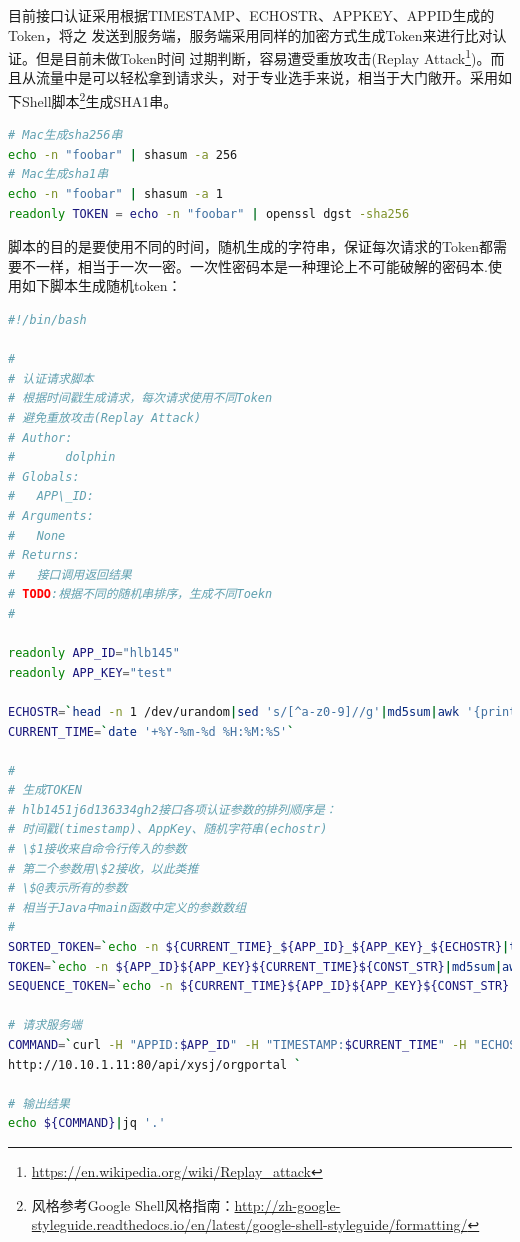 \documentclass[12pt]{book}
\numberwithin{dummy}{section}
\theoremstyle{ocrenumbox}
\theoremstyle{blacknumex}
\theoremstyle{blacknumbox}
\theoremstyle{ocrenum}
\begin{document}
目前接口认证采用根据TIMESTAMP、ECHOSTR、APPKEY、APPID生成的Token，将之
发送到服务端，服务端采用同样的加密方式生成Token来进行比对认证。但是目前未做Token时间
过期判断，容易遭受重放攻击(Replay Attack\footnote{\url{https://en.wikipedia.org/wiki/Replay_attack}})。而且从流量中是可以轻松拿到请求头，对于专业选手来说，相当于大门敞开。采用如下Shell脚本\footnote{风格参考Google Shell风格指南：\url{http://zh-google-styleguide.readthedocs.io/en/latest/google-shell-styleguide/formatting/}}生成SHA1串。

\begin{lstlisting}[language=Bash]
# Mac生成sha256串
echo -n "foobar" | shasum -a 256
# Mac生成sha1串
echo -n "foobar" | shasum -a 1
readonly TOKEN = echo -n "foobar" | openssl dgst -sha256
\end{lstlisting}

脚本的目的是要使用不同的时间，随机生成的字符串，保证每次请求的Token都需要不一样，相当于一次一密。一次性密码本是一种理论上不可能破解的密码本\cite{secrettech}.使用如下脚本生成随机token：

\begin{lstlisting}[language=Bash]
#!/bin/bash

#
# 认证请求脚本
# 根据时间戳生成请求，每次请求使用不同Token
# 避免重放攻击(Replay Attack)
# Author:
# 		dolphin
# Globals:
#   APP\_ID:
# Arguments:
#   None
# Returns:
#   接口调用返回结果
# TODO:根据不同的随机串排序，生成不同Toekn
#

readonly APP_ID="hlb145"
readonly APP_KEY="test"

ECHOSTR=`head -n 1 /dev/urandom|sed 's/[^a-z0-9]//g'|md5sum|awk '{print $1}'`
CURRENT_TIME=`date '+%Y-%m-%d %H:%M:%S'`

#
# 生成TOKEN
# hlb1451j6d136334gh2接口各项认证参数的排列顺序是：
# 时间戳(timestamp)、AppKey、随机字符串(echostr)
# \$1接收来自命令行传入的参数
# 第二个参数用\$2接收，以此类推
# \$@表示所有的参数
# 相当于Java中main函数中定义的参数数组
#
SORTED_TOKEN=`echo -n ${CURRENT_TIME}_${APP_ID}_${APP_KEY}_${ECHOSTR}|tr '_' '\t'|sort|tr -d '\011'`
TOKEN=`echo -n ${APP_ID}${APP_KEY}${CURRENT_TIME}${CONST_STR}|md5sum|awk '{print $1}'`
SEQUENCE_TOKEN=`echo -n ${CURRENT_TIME}${APP_ID}${APP_KEY}${CONST_STR}|shasum -a 1|awk '{print $1}'`

# 请求服务端
COMMAND=`curl -H "APPID:$APP_ID" -H "TIMESTAMP:$CURRENT_TIME" -H "ECHOSTR:$CONST_STR" -H "TOKEN:$SEQUENCE_TOKEN" \
http://10.10.1.11:80/api/xysj/orgportal `

# 输出结果
echo ${COMMAND}|jq '.'
\end{lstlisting}
\end{document}
